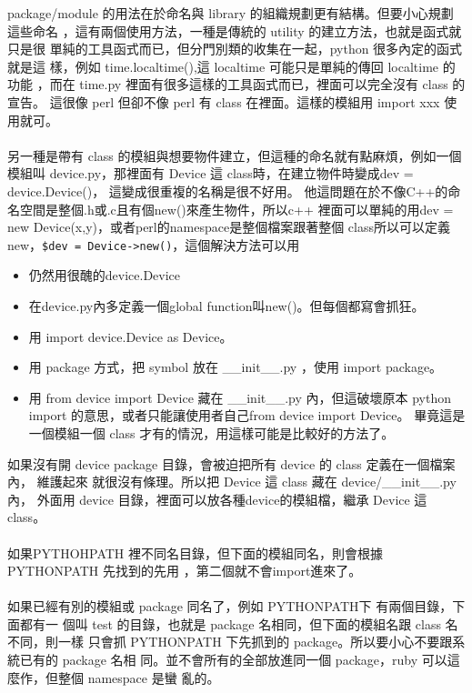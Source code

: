 package/module 的用法在於命名與 library 的組織規劃更有結構。但要小心規劃這些命名
，這有兩個使用方法，一種是傳統的 utility 的建立方法，也就是函式就只是很
單純的工具函式而已，但分門別類的收集在一起，python 很多內定的函式就是這
樣，例如 time.localtime(),這 localtime 可能只是單純的傳回 localtime 的功能
，而在 time.py 裡面有很多這樣的工具函式而已，裡面可以完全沒有 class 的宣告。
這很像 perl 但卻不像 perl 有 class 在裡面。這樣的模組用 import xxx 使用就可。
\\\\
另一種是帶有 class 的模組與想要物件建立，但這種的命名就有點麻煩，例如一個模組叫
device.py，那裡面有 Device 這 class時，在建立物件時變成dev = device.Device()，
這變成很重複的名稱是很不好用。
他這問題在於不像C++的命名空間是整個.h或.c且有個new()來產生物件，所以c++
裡面可以單純的用dev = new Device(x,y)，或者perl的namespace是整個檔案跟著整個
class所以可以定義new，\verb|$dev = Device->new()|，這個解決方法可以用
\begin{itemize}
  \item 仍然用很醜的device.Device
  \item 在device.py內多定義一個global function叫new()。但每個都寫會抓狂。
  \item 用 import device.Device as Device。
  \item 用 package 方式，把 symbol 放在 \_\_init\_\_.py ，使用 import package。
  \item 用 from device import Device 藏在 \_\_init\_\_.py 內，但這破壞原本
    python import 的意思，或者只能讓使用者自己from device import Device。
    畢竟這是一個模組一個 class 才有的情況，用這樣可能是比較好的方法了。
\end{itemize}
如果沒有開 device package 目錄，會被迫把所有 device 的 class 定義在一個檔案內，
維護起來 就很沒有條理。所以把 Device 這 class 藏在 device/\_\_init\_\_.py 內，
外面用 device 目錄，裡面可以放各種device的模組檔，繼承 Device 這 class。
\\\\
如果PYTHOHPATH 裡不同名目錄，但下面的模組同名，則會根據 PYTHONPATH 先找到的先用
，第二個就不會import進來了。
\\\\
如果已經有別的模組或 package 同名了，例如 PYTHONPATH下 有兩個目錄，下面都有一
個叫 test 的目錄，也就是 package 名相同，但下面的模組名跟 class 名不同，則一樣
只會抓 PYTHONPATH 下先抓到的 package。所以要小心不要跟系統已有的 package 名相
同。並不會所有的全部放進同一個 package，ruby 可以這麼作，但整個 namespace 是蠻
亂的。
\\\\
